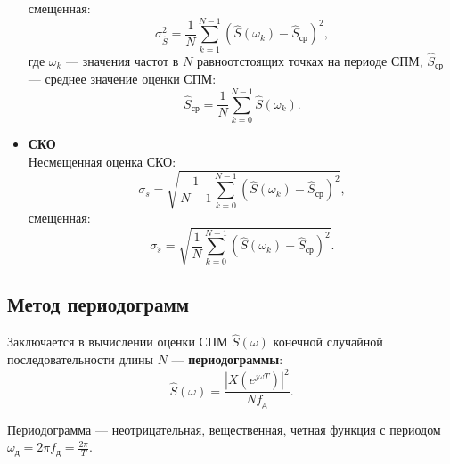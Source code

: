 \documentclass[a4paper, 14pt]{extarticle}
\begin{document}
\begin{itemize}
        смещенная:
        \begin{equation}
        \sigma_{\hat{S}}^2 = \frac{1}{N} \sum_{k=1}^{N-1} {\left( \hat{S}(\omega_k) - \hat{S}_\text{ср} \right)}^2,
        \end{equation}
        где $\omega_k$ --- значения частот в $N$ равноотстоящих точках на периоде СПМ, $\hat{S}_\text{ср}$ --- среднее значение оценки СПМ:
        \begin{equation}
            \hat{S}_\text{ср} = \frac{1}{N} \sum_{k=0}^{N-1} \hat{S}(\omega_k).
        \end{equation}
    \item \textbf{СКО}\\
        Несмещенная оценка СКО:
        \begin{equation}
            \sigma_{\dot{s}} = \sqrt{ \frac{1}{N-1} \sum^{N-1}_{k=0} {(\hat{S}( \omega_k ) - \hat{S}_\text{ср})}^2 },
        \end{equation}
        смещенная:
        \begin{equation}
            \sigma_{\dot{s}} = \sqrt{ \frac{1}{N} \sum^{N-1}_{k=0} {(\hat{S}( \omega_k ) - \hat{S}_\text{ср})}^2 }.
        \end{equation}
\end{itemize}

\subsection{Метод периодограмм}
Заключается в вычислении оценки СПМ $\hat{S}( \omega )$ конечной случайной последовательности длины $N$ --- \textbf{периодограммы}:
\begin{equation}
    \hat{S}(\omega) = \frac{\left| X(e^{j \omega T}) \right|^2}{Nf_\text{д}}.
\end{equation}

Периодограмма --- неотрицательная, вещественная, четная функция с периодом $\omega_\text{д} = 2\pi f_\text{д} = \frac{2\pi}{T} $.
\end{document}

